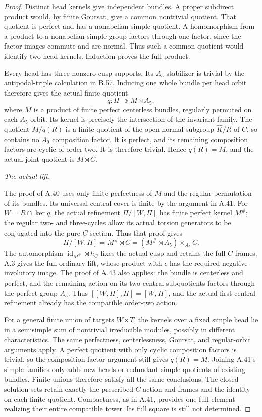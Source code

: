 \begin{proof}
Distinct head kernels give independent bundles.
A proper subdirect product would, by finite
Goursat, give a common nontrivial quotient. That
quotient is perfect and has a nonabelian simple
quotient. A homomorphism from a product to a
nonabelian simple group factors through one
factor, since the factor images commute and are
normal. Thus such a common quotient would identify
two head kernels. Induction proves the full product.

Every head has three nonzero cusp supports. Its
\(A_5\)-stabilizer is trivial by the antipodal-triple
calculation in B.57. Inducing one whole bundle
per head orbit therefore gives the actual finite
quotient
\[
              q:\Pi\twoheadrightarrow M\rtimes A_5,
\]
where \(M\) is a product of finite perfect
centerless bundles, regularly permuted on each
\(A_5\)-orbit. Its kernel is precisely the
intersection of the invariant family.
The quotient \(M/q(R)\) is a finite quotient of
the open normal subgroup \(\widehat K/R\) of
\(C\), so contains no \(A_9\) composition factor.
It is perfect, and its remaining composition
factors are cyclic of order two. It is therefore
trivial. Hence \(q(R)=M\), and the actual joint
quotient is \(M\rtimes C\).

\emph{The actual lift.}\par
The proof of A.40 uses only finite perfectness
of \(M\) and the regular permutation of its
bundles. Its universal central cover is finite
by the argument in A.41. For
\(W=R\cap\ker q\), the actual refinement
\(\Pi/[W,\Pi]\) has finite perfect kernel
\(M^\#\); the regular two- and three-cycles
allow its actual torsion generators to be
conjugated into the pure \(C\)-section.
Thus that proof gives
\[
 \Pi/[W,\Pi]
       =M^\#\rtimes C
       =(M^\#\rtimes A_5)\times_{A_5}C.
\]
The automorphism \(\operatorname{id}_{M^\#}\rtimes h_C\)
fixes the actual cusp and retains the full
\(C\)-frames. A.3 gives the full ordinary lift,
whose product with \(c\) has the required
negative involutory image. The proof of A.43
also applies: the bundle is centerless and
perfect, and the remaining action on its two
central subquotients factors through the perfect
group \(A_5\). Thus
\( [[W,\Pi],\Pi]=[W,\Pi]\), and the actual
first central refinement already has the
compatible order-two action.

For a general finite union of targets
\(W\rtimes T\), the kernels over a fixed simple
head lie in a semisimple sum of nontrivial
irreducible modules, possibly in different
characteristics. The same perfectness,
centerlessness, Goursat, and regular-orbit
arguments apply. A perfect quotient with only
cyclic composition factors is trivial, so the
composition-factor argument still gives
\(q(R)=M\). Joining A.41's simple families only
adds new heads or redundant simple quotients
of existing bundles. Finite unions therefore
satisfy all the same conclusions. The closed
solution sets retain exactly the prescribed
\(C\)-action and frames and the identity on
each finite quotient. Compactness, as in A.41,
provides one full element realizing their
entire compatible tower. Its full square is
still not determined.
\end{proof}

